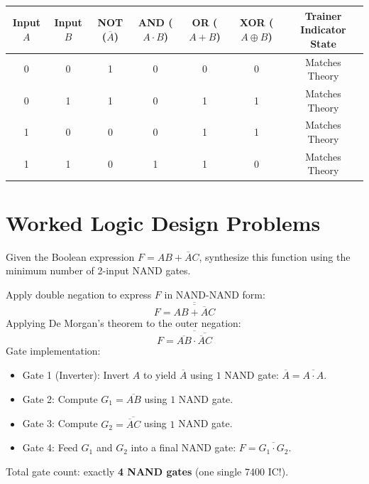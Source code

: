 \begin{observationtable}
\begin{center}
\begin{tabular}{ccccccc}
\toprule
\textbf{Input $A$} & \textbf{Input $B$} & \textbf{NOT ($\overline{A}$)} & \textbf{AND ($A \cdot B$)} & \textbf{OR ($A + B$)} & \textbf{XOR ($A \oplus B$)} & \textbf{Trainer Indicator State} \\
\midrule
0 & 0 & 1 & 0 & 0 & 0 & Matches Theory \\
0 & 1 & 1 & 0 & 1 & 1 & Matches Theory \\
1 & 0 & 0 & 0 & 1 & 1 & Matches Theory \\
1 & 1 & 0 & 1 & 1 & 0 & Matches Theory \\
\bottomrule
\end{tabular}
\end{center}
\end{observationtable}

\section{Worked Logic Design Problems}
\begin{example}
Given the Boolean expression $F = A B + \overline{A} C$, synthesize this function using the minimum number of 2-input NAND gates.
\end{example}
\begin{solutionbox}
Apply double negation to express $F$ in NAND-NAND form:
\[ F = \overline{\overline{A B + \overline{A} C}} \]
Applying De Morgan's theorem to the outer negation:
\[ F = \overline{\overline{AB} \cdot \overline{\overline{A}C}} \]
Gate implementation:
\begin{itemize}
    \item Gate 1 (Inverter): Invert $A$ to yield $\overline{A}$ using $1$ NAND gate: $\overline{A} = \overline{A \cdot A}$.
    \item Gate 2: Compute $G_1 = \overline{A B}$ using $1$ NAND gate.
    \item Gate 3: Compute $G_2 = \overline{\overline{A} C}$ using $1$ NAND gate.
    \item Gate 4: Feed $G_1$ and $G_2$ into a final NAND gate: $F = \overline{G_1 \cdot G_2}$.
\end{itemize}
Total gate count: exactly \textbf{4 NAND gates} (one single 7400 IC!).
\end{solutionbox}


